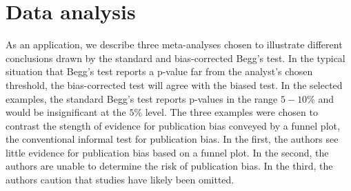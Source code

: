 \documentclass[12pt]{article}
\begin{document}

    \section{Data analysis}\label{section:data analysis}

    As an application, we describe three meta-analyses chosen to
    illustrate different conclusions drawn by the standard and
    bias-corrected Begg's test. In the typical situation that Begg's
    test reports a p-value far from the analyst's chosen threshold, the
    bias-corrected test will agree with the biased test. In the
    selected examples, the standard Begg's test reports p-values in the range
    $5-10\%$ and would be insignificant at the $5\%$ level. The three
    examples were chosen to contrast the stength of evidence for
    publication bias conveyed by a funnel plot, the conventional
    informal test for publication bias. In the first, the authors see
    little evidence for publication bias based on a funnel plot. In
    the second, the authors are unable to determine the risk of
    publication bias. In the third, the authors caution that studies
    have likely been omitted.
    
    
\end{document}
